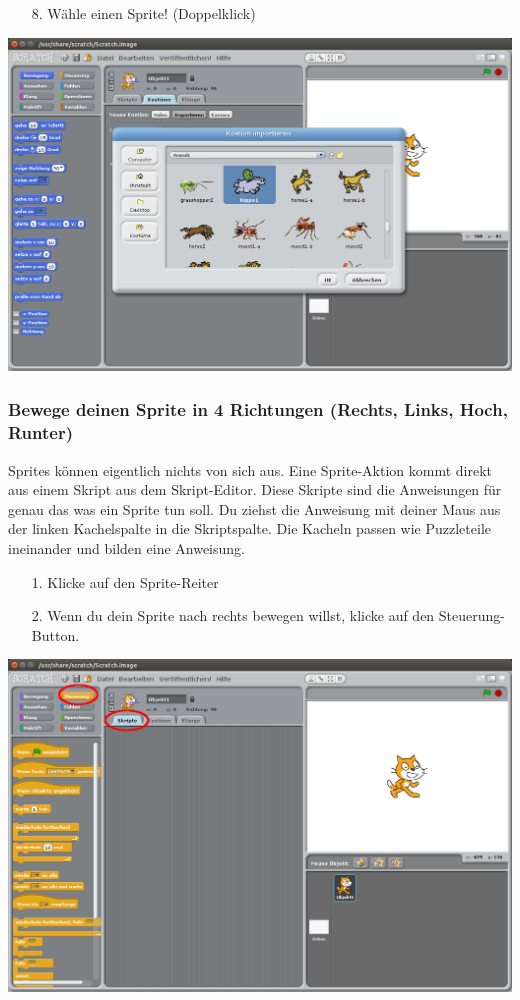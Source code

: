 \begin{itemize}
\item[8.] Wähle einen  Sprite! (Doppelklick)
\end{itemize}

\includegraphics[width=\textwidth]{images/aufgabe1_tiere.png}

\subsubsection{Bewege deinen Sprite in 4 Richtungen (Rechts, Links, Hoch, Runter)}

Sprites können eigentlich nichts von sich aus. Eine Sprite-Aktion kommt direkt aus einem Skript aus dem Skript-Editor. Diese Skripte sind die Anweisungen für genau das was ein Sprite tun soll.
Du ziehst die Anweisung mit deiner Maus aus der linken Kachelspalte in die Skriptspalte. Die Kacheln passen wie Puzzleteile ineinander und bilden eine Anweisung.


\begin{itemize}
\item[1.] Klicke auf den Sprite-Reiter
\item[2.] Wenn du dein Sprite nach rechts bewegen willst, klicke auf den Steuerung-Button.
\end{itemize}
\includegraphics[width=\textwidth]{images/aufgabe1_steuerung.png}

